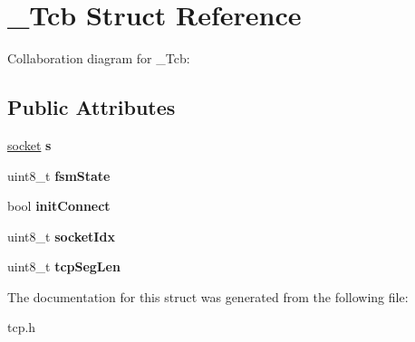 \hypertarget{struct__Tcb}{}\section{\+\_\+\+Tcb Struct Reference}
\label{struct__Tcb}


Collaboration diagram for \+\_\+\+Tcb\+:
\subsection*{Public Attributes}
\begin{DoxyCompactItemize}
\item 
\mbox{\label{struct__Tcb_a5c2b240066167fd6e82cadce2915ba81}} 
\hyperlink{struct__socket}{socket} {\bfseries s}
\item 
\mbox{\label{struct__Tcb_afaf3e24995780a19fa4ef468cd935dd0}} 
uint8\+\_\+t {\bfseries fsm\+State}
\item 
\mbox{\label{struct__Tcb_ac752a140a651bc5b40c5e249a379653f}} 
bool {\bfseries init\+Connect}
\item 
\mbox{\label{struct__Tcb_aecc2db02b3ede89fffb9c067c114f0a5}} 
uint8\+\_\+t {\bfseries socket\+Idx}
\item 
\mbox{\label{struct__Tcb_ab0822736115f712f094a271a5beebe44}} 
uint8\+\_\+t {\bfseries tcp\+Seg\+Len}
\end{DoxyCompactItemize}


The documentation for this struct was generated from the following file\+:\begin{DoxyCompactItemize}
\item 
tcp.\+h\end{DoxyCompactItemize}
